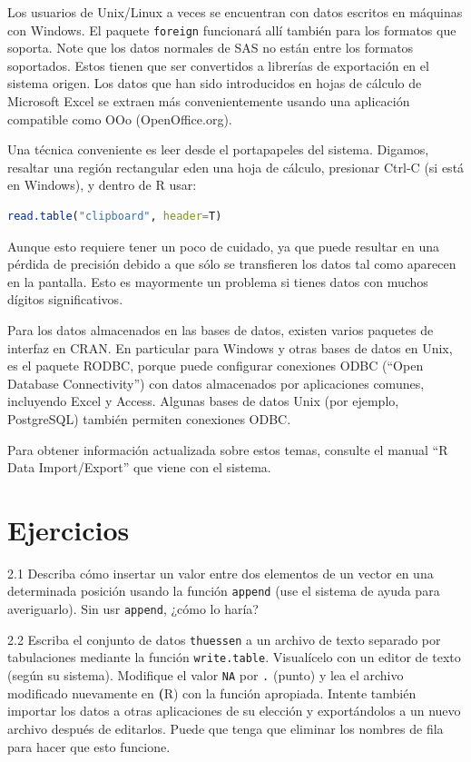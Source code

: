 Los usuarios de Unix/Linux a veces se encuentran con datos escritos en máquinas
con Windows. El paquete \texttt{foreign} funcionará allí también para los
formatos que soporta. Note que los datos normales de SAS no están entre los
formatos soportados. Estos tienen que ser convertidos a librerías de exportación
en el sistema origen. Los datos que han sido introducidos en hojas de cálculo de
Microsoft Excel se extraen más convenientemente usando una aplicación compatible
como OOo (OpenOffice.org).


Una técnica conveniente es leer desde el portapapeles del sistema. Digamos,
resaltar una región rectangular eden una hoja de cálculo, presionar Ctrl-C (si
está en Windows), y dentro de R usar:

\begin{lstlisting}[language=R]
read.table("clipboard", header=T)
\end{lstlisting}

Aunque esto requiere tener un poco de cuidado, ya que puede resultar en una
pérdida de precisión debido a que sólo se transfieren los datos tal como
aparecen en la pantalla. Esto es mayormente un problema si tienes datos con
muchos dígitos significativos.

Para los datos almacenados en las bases de datos, existen varios paquetes de
interfaz en CRAN. En particular para Windows y otras bases de datos en
Unix, es el paquete RODBC, porque puede configurar conexiones ODBC (``Open
Database Connectivity'') con datos almacenados por aplicaciones comunes,
incluyendo Excel y Access. Algunas bases de datos Unix (por ejemplo, PostgreSQL)
también permiten conexiones ODBC.

Para obtener información actualizada sobre estos temas, consulte el manual
``R Data Import/Export'' que viene con el sistema.


\section{Ejercicios}

2.1 Describa cómo insertar un valor entre dos elementos de un vector en una determinada
posición usando la función \texttt{append} (use el sistema de ayuda para averiguarlo).
Sin usr \texttt{append}, ¿cómo lo haría?

2.2 Escriba el conjunto de datos \texttt{thuessen} a un archivo de texto
separado por tabulaciones mediante la función \texttt{write.table}. Visualícelo con un editor de
texto (según su sistema). Modifique el valor \texttt{NA} por \texttt{.} (punto)
y lea el archivo modificado nuevamente en \textbf(R) con la función apropiada.
Intente también importar los datos a otras aplicaciones de su elección y
exportándolos a un nuevo archivo después de editarlos. Puede que tenga que
eliminar los nombres de fila para hacer que esto funcione.
